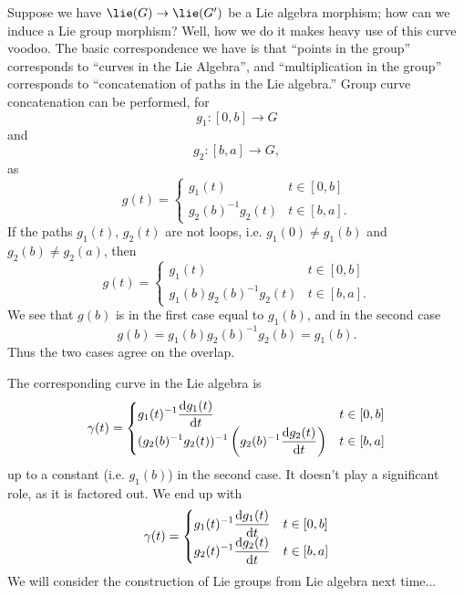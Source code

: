 
Suppose we have $\lie(G)\to\lie(G')$ be a Lie algebra morphism;
how can we induce a Lie group morphism? Well, how we do it makes
heavy use of this curve voodoo. The basic correspondence we have
is that ``points in the group'' corresponds to ``curves in the
Lie Algebra'', and ``multiplication in the group'' corresponds to
``concatenation of paths in the Lie algebra.'' Group curve
concatenation can be performed, for 
\begin{equation}
g_{1}:[0,b]\to G
\end{equation}
and
\begin{equation}
g_{2}:[b,a]\to G,
\end{equation}
as 
\begin{equation}
g(t)=\begin{cases} g_{1}(t) & t\in[0,b]\\
g_{2}(b)^{-1}g_{2}(t) & t\in[b,a].
\end{cases}
\end{equation}
If the paths $g_{1}(t)$, $g_{2}(t)$ are not loops,
i.e. $g_{1}(0)\not=g_{1}(b)$ and $g_{2}(b)\not=g_{2}(a)$, then
\begin{equation}
g(t)=\begin{cases} g_{1}(t) & t\in[0,b]\\
g_{1}(b)g_{2}(b)^{-1}g_{2}(t) & t\in[b,a].
\end{cases}
\end{equation}
We see that $g(b)$ is in the first case equal to $g_{1}(b)$, and
in the second case
\begin{equation}
g(b) = g_{1}(b)g_{2}(b)^{-1}g_{2}(b) = g_{1}(b).
\end{equation}
Thus the two cases agree on the overlap.

The corresponding curve in the Lie algebra is
\begin{equation}
\gamma(t) = \begin{cases}\displaystyle
g_{1}(t)^{-1}\frac{\mathrm{d} g_{1}(t)}{\mathrm{d} t} & t\in[0,b]\\
\displaystyle (g_{2}(b)^{-1}g_{2}(t))^{-1}\left(g_{2}(b)^{-1}\frac{\mathrm{d} g_{2}(t)}{\mathrm{d} t}\right)
& t\in[b,a]
\end{cases}
\end{equation}
up to a constant (i.e. $g_{1}(b)$) in the second case. It doesn't
play a significant role, as it is factored out. We end up with
\begin{equation}
\gamma(t) = \begin{cases}\displaystyle
g_{1}(t)^{-1}\frac{\mathrm{d} g_{1}(t)}{\mathrm{d} t} & t\in[0,b]\\
\displaystyle g_{2}(t)^{-1}\frac{\mathrm{d} g_{2}(t)}{\mathrm{d} t} & t\in[b,a]
\end{cases}
\end{equation}
We will consider the construction of Lie groups from Lie algebra
next time...

